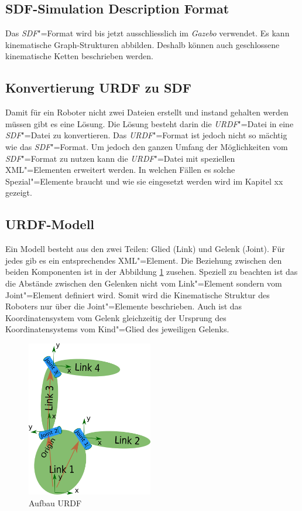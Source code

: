 \subsection{SDF-Simulation Description Format}
\label{chap:sdf}
Das \textit{SDF}"=Format wird bis jetzt ausschliesslich im \textit{Gazebo} verwendet.
Es kann kinematische Graph-Strukturen abbilden.
Deshalb können auch geschlossene kinematische Ketten beschrieben werden.

\subsection{Konvertierung URDF zu SDF}
\label{chap:konvertierung}
Damit für ein Roboter nicht zwei Dateien erstellt und instand gehalten werden müssen gibt es eine Lösung.
Die Lösung besteht darin die \textit{URDF}"=Datei in eine \textit{SDF}"=Datei zu konvertieren.
Das \textit{URDF}"=Format ist jedoch nicht so mächtig wie das \textit{SDF}"=Format.
Um jedoch den ganzen Umfang der Möglichkeiten vom \textit{SDF}"=Format zu nutzen kann die \textit{URDF}"=Datei mit speziellen XML"=Elementen erweitert werden.
In welchen Fällen es solche Spezial"=Elemente braucht und wie sie eingesetzt werden wird im Kapitel xx gezeigt. %

\subsection{URDF-Modell}
\label{urdf-modell}
Ein Modell besteht aus den zwei Teilen: Glied (Link) und Gelenk (Joint).
Für jedes gib es ein entsprechendes XML"=Element.
Die Beziehung zwischen den beiden Komponenten ist in der Abbildung \ref{Ab:aufbaut-urdf} zusehen.
Speziell zu beachten ist das die Abstände zwischen den Gelenken nicht vom Link"=Element sondern vom Joint"=Element definiert wird.
Somit wird die Kinematische Struktur des Roboters nur über die Joint"=Elemente beschrieben.
Auch ist das Koordinatensystem vom Gelenk gleichzeitig der Ursprung des Koordinatensystems vom Kind"=Glied des jeweiligen Gelenks.
\begin{figure}[ht!]
	\centering
	\includegraphics[width=5.5cm]{images/urdf_model.png}
	\caption{Aufbau URDF \cite{ros}}
	\label{Ab:aufbaut-urdf}
\end{figure}

